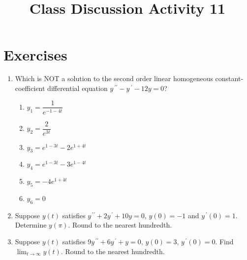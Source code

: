 \documentclass{ximera}
\begin{document}
\begin{abstract}
 \end{abstract}

    \title{Class Discussion Activity 11}
    
    \maketitle

\section*{Exercises}


\begin{enumerate}[label=(\arabic*)]

\item Which is NOT a solution to the second order linear homogeneous constant-coefficient differential equation $\displaystyle y\,^{\prime\prime}-y\,^{\prime}-12y=0$? 


\begin{enumerate}[label=(\alph*)]
\item $y_1=\dfrac{1}{e^{-1-4t}}$
\item $y_2=\dfrac{2}{e^{3t}}$
\item $y_3=e^{1-3t}-2e^{1+4t}$  
\item $y_4=e^{1-3t}-3e^{1-4t}$ %
\item $y_5=-4e^{1+4t}$
\item $y_6=0$
\end{enumerate}



\item  Suppose $y(t)$ satisfies $y^{\,\prime\prime}+2y^{\,\prime}+10y=0$, $y(0)=-1$ and $y^{\,\prime}(0)=1$.  Determine $y(\pi)$.  Round to the nearest hundredth.


\item Suppose $y(t)$ satisfies $9y^{\,\prime\prime}+6y^{\,\prime}+y=0$, $y(0)=3$, $y^{\,\prime}(0)=0$.  Find $\displaystyle \lim_{t\rightarrow \infty} y(t)$.  Round to the nearest hundredth.


\newpage


\end{enumerate}
\end{document}
